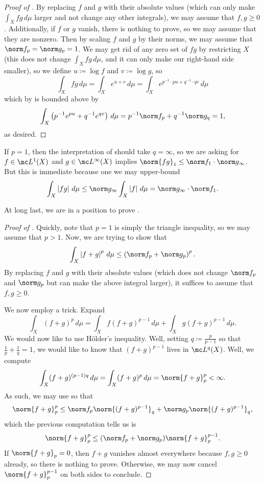 \documentclass[../notes.tex]{subfiles}
\begin{document}
\begin{proof}[Proof of ]
	By replacing $f$ and $g$ with their absolute values (which can only make $\int_X fg\,d\mu$ larger and not change any other integrals), we may assume that $f,g\ge0$. Additionally, if $f$ or $g$ vanish, there is nothing to prove, so we may assume that they are nonzero. Then by scaling $f$ and $g$ by their norms, we may assume that $\norm f_p=\norm g_p=1$. We may get rid of any zero set of $fg$ by restricting $X$ (this does not change $\int_Xfg\,d\mu$, and it can only make our right-hand side smaller), so we define $u\coloneqq\log f$ and $v\coloneqq\log g$, so
	\[\int_X fg\,d\mu = \int_Xe^{u+v}\,d\mu = \int_Xe^{p^{-1}\cdot pu+q^{-1}\cdot qv}\,d\mu\]
	which by  is bounded above by
	\[\int_X\left(p^{-1}e^{pu}+q^{-1}e^{qv}\right)\,d\mu=p^{-1}\norm f_p+q^{-1}\norm g_q=1,\]
	as desired.
\end{proof}
\begin{remark}
	If $p=1$, then the interpretation of  should take $q=\infty$, so we are asking for $f\in\mc L^1(X)$ and $g\in\mc L^\infty(X)$ implies $\norm{fg}_1\le\norm f_1\cdot\norm g_\infty$. But this is immediate because one we may upper-bound
	\[\int_X\left|fg\right|\,d\mu\le\norm g_\infty\int_X\left|f\right|\,d\mu=\norm g_\infty\cdot\norm f_1.\]
\end{remark}
At long last, we are in a position to prove .
\begin{proof}[Proof of ]
	Quickly, note that $p=1$ is simply the triangle inequality, so we may assume that $p>1$. Now, we are trying to show that
	\[\int_X\left|f+g\right|^p\,d\mu\le\left(\norm f_p+\norm g_p\right)^p.\]
	By replacing $f$ and $g$ with their absolute values (which does not change $\norm f_p$ and $\norm g_p$ but can make the above integral larger), it suffices to assume that $f,g\ge0$.

	We now employ a trick. Expand
	\[\int_X(f+g)^p\,d\mu=\int_Xf(f+g)^{p-1}\,d\mu+\int_Xg(f+g)^{p-1}\,d\mu.\]
	We would now like to use H\"older's inequality. Well, setting $q\coloneqq\frac p{p-1}$ so that $\frac1p+\frac1q=1$, we would like to know that $(f+g)^{p-1}$ lives in $\mc L^q(X)$. Well, we compute
	\[\int_X(f+g)^{(p-1)q}\,d\mu=\int_X(f+g)^p\,d\mu=\norm{f+g}_p^p<\infty.\]
	As such, we may use  so that
	\[\norm{f+g}_p^p\le\norm f_p\norm{(f+g)^{p-1}}_q+\norm g_p\norm{(f+g)^{p-1}}_q,\]
	which the previous computation tells us is
	\[\norm{f+g}_p^p\le(\norm f_p+\norm g_p)\norm{f+g}_p^{p-1}.\]
	If $\norm{f+g}_p=0$, then $f+g$ vanishes almost everywhere because $f,g\ge0$ already, so there is nothing to prove. Otherwise, we may now cancel $\norm{f+g}_p^{p-1}$ on both sides to conclude.
\end{proof}
\end{document}
